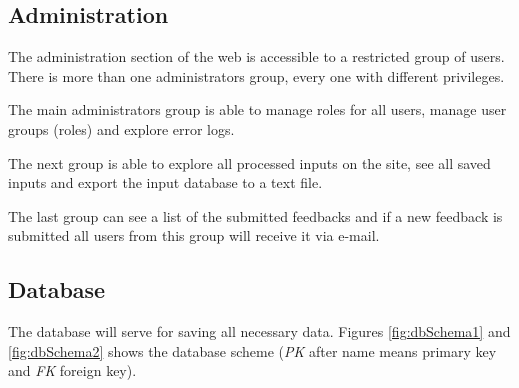 \subsection{Administration}

The administration section of the web is accessible to a restricted group of users.
There is more than one administrators group, every one with different privileges.

The main administrators group is able to manage roles for all users, manage user groups (roles) and explore error logs.

The next group is able to explore all processed inputs on the site, see all saved inputs and export the input database to a text file.

The last group can see a list of the submitted feedbacks and if a new feedback is submitted all users from this group will receive it via e-mail.


\subsection{Database}

The database will serve for saving all necessary data.
Figures \ref{fig:dbSchema1} and \ref{fig:dbSchema2} shows the database scheme (\emph{PK} after name means primary key and \emph{FK} foreign key).


